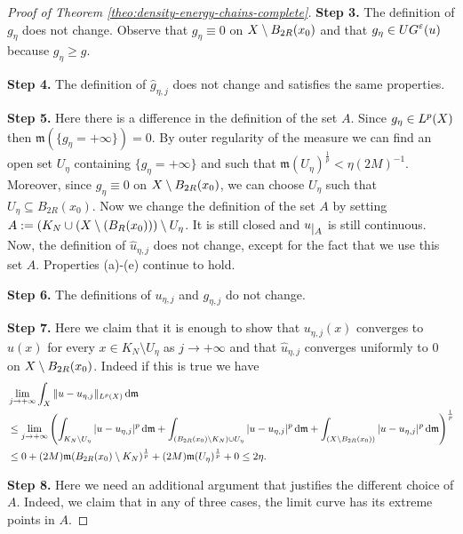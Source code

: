 \documentclass[12pt]{amsart}
\renewcommand{\d}{{\mathrm d}}
\newcommand{\restr}[1]{\lower3pt\hbox{$|_{#1}$}}
\newcommand{\X}{{\rm X}}
\newcommand{\mm}{\mathfrak m}
\theoremstyle{definition}
\newcommand{\UG}[1]{{\rm UG}^{#1}}
\begin{document}
\begin{proof}[Proof of Theorem \ref{theo:density-energy-chains-complete}]
    {\bf Step 3.} The definition of $g_\eta$ does not change. Observe that $g_\eta \equiv 0$ on $\X \setminus B_{2R}(x_0)$ and that $g_\eta \in \UG{\varepsilon}(u)$ because $g_\eta \ge g$.
    
    {\bf Step 4.} The definition of $\hat{g}_{\eta,j}$ does not change and satisfies the same properties.
    
    {\bf Step 5.} Here there is a difference in the definition of the set $A$. Since $g_\eta \in L^p(\X)$ then $\mm(\{g_\eta = +\infty \})=0$. By outer regularity of the measure we can find an open set $U_\eta$ containing $\{g_\eta = +\infty \}$ and such that $\mm(U_\eta)^{\frac{1}{p}} < \eta (2M)^{-1}$. Moreover, since $g_\eta \equiv 0$ on $\X \setminus B_{2R}(x_0)$, we can choose $U_\eta$ such that $U_\eta \subseteq B_{2R}(x_0)$.
    Now we change the definition of the set $A$ by setting $A := (K_N \cup (\X \setminus (B_R(x_0))) \setminus U_\eta$. It is still closed and $u\restr{A}$ is still continuous.
    Now, the definition of $\hat{u}_{\eta,j}$ does not change, except for the fact that we use this set $A$. Properties (a)-(e) continue to hold.

    {\bf Step 6.} The definitions of $u_{\eta,j}$ and $g_{\eta,j}$ do not change.
    
    {\bf Step 7.} Here we claim that it is enough to show that $u_{\eta,j}(x)$ converges to $u(x)$ for every $x\in K_N\setminus U_\eta$ as $j \to +\infty$ and that $\hat{u}_{\eta,j}$ converges uniformly to $0$ on $\X\setminus B_{2R}(x_0)$. Indeed if this is true we have
    \begin{equation}
        \begin{aligned}
            &\lim_{j\to +\infty} \int_\X \Vert u - u_{\eta,j} \Vert_{L^p(\X)} \,\d\mm \\
            &\le\lim_{j\to +\infty}\left(\int_{K_N \setminus U_\eta} \vert u - u_{\eta,j} \vert^p \,\d\mm + \int_{(B_{2R}(x_0)\setminus K_N) \cup U_\eta} \vert u - u_{\eta,j} \vert^p \,\d\mm + \int_{(\X \setminus B_{2R}(x_0))} \vert u - u_{\eta,j} \vert^p \,\d\mm \right)^{\frac{1}{p}}\\
            &\le 0 + (2M) \mm(B_{2R}(x_0) \setminus K_N)^{\frac{1}{p}} + (2M)\mm(U_\eta)^{\frac{1}{p}} + 0 \le 2\eta.
        \end{aligned}
    \end{equation}

    {\bf Step 8.} Here we need an additional argument that justifies the different choice of $A$. Indeed, we claim that in any of three cases, the limit curve has its extreme points in $A$.
    

\end{proof}
\end{document}
